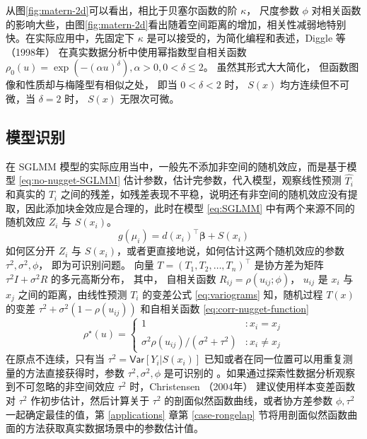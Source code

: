 \documentclass[12pt,a4paper,UTF8,twoside]{book}
\theoremstyle{definition}
\theoremstyle{definition}
\theoremstyle{definition}
\theoremstyle{remark}
\begin{document}
从图\ref{fig:matern-2d}可以看出，相比于贝塞尔函数的阶 \(\kappa\)，
尺度参数 \(\phi\)
对相关函数的影响大些，由图\ref{fig:matern-2d}看出随着空间距离的增加，相关性减弱地特别快。在实际应用中，先固定下
\(\kappa\) 是可以接受的，为简化编程和表述，Diggle 等 （1998年）
\citep{Diggle1998} 在真实数据分析中使用幂指数型自相关函数
\(\rho_{0}(u) = \exp(-(\alpha u)^{\delta}), \alpha > 0, 0 < \delta \leq 2\)。
虽然其形式大大简化， 但函数图像和性质却与梅隆型有相似之处， 即当
\(0 < \delta < 2\) 时， \(S(x)\) 均方连续但不可微，当 \(\delta = 2\)
时， \(S(x)\) 无限次可微。

\hypertarget{subsec:identify}{%
\subsection{模型识别}\label{subsec:identify}}

在 SGLMM 模型的实际应用当中，一般先不添加非空间的随机效应，而是基于模型
\eqref{eq:no-nugget-SGLMM} 估计参数，估计完参数，代入模型，观察线性预测
\(\hat{T_{i}}\) 和真实的 \(T_i\)
之间的残差，如残差表现不平稳，说明还有非空间的随机效应没有提取，因此添加块金效应是合理的，此时在模型
\eqref{eq:SGLMM} 中有两个来源不同的随机效应 \(Z_{i}\) 与 \(S(x_i)\)。
\begin{equation}
g(\mu_i) = d(x_i)^{\top}\boldsymbol{\beta} + S(x_i) \label{eq:no-nugget-SGLMM}
\end{equation} 如何区分开 \(Z_{i}\) 与
\(S(x_i)\)，或者更直接地说，如何估计这两个随机效应的参数
\(\tau^2, \sigma^2, \phi\)， 即为可识别问题。 向量
\(T = (T_1,T_2,\ldots,T_n)^{\top}\) 是协方差为矩阵
\(\tau^2I + \sigma^2R\) 的多元高斯分布， 其中， 自相关函数
\(R_{ij} = \rho(u_{ij}; \phi)\)， \(u_{ij}\) 是 \(x_i\) 与 \(x_j\)
之间的距离，由线性预测 \(T_{i}\) 的变差公式 \eqref{eq:variograms}
知，随机过程 \(T(x)\) 的变差 \(\tau^2 + \sigma^2(1-\rho(u_{ij}))\)
和自相关函数 \eqref{eq:corr-nugget-function} \begin{equation}
\rho^{\star}(u) =
\begin{cases}
                                     1 & : x_{i} = x_{j}  \\
\sigma^2\rho(u_{ij})/(\sigma^2+\tau^2) & : x_{i} \neq x_{j}
\end{cases} \label{eq:corr-nugget-function}
\end{equation} \noindent 在原点不连续，只有当
\(\tau^2 = \mathsf{Var}[Y_i|S(x_i)]\)
已知或者在同一位置可以用重复测量的方法直接获得时，参数
\(\tau^2, \sigma^2, \phi\) 是可识别的
\citep{Diggle2002Childhood, Diggle2007}。如果通过探索性数据分析观察到不可忽略的非空间效应
\(\tau^2\) 时，Christensen （2004年） \citep{Christensen2004}
建议使用样本变差函数对 \(\tau^2\) 作初步估计，然后计算关于 \(\tau^2\)
的剖面似然函数曲线，或者协方差参数 \(\phi,\tau^2\)一起确定最佳的值，第
\ref{applications} 章第 \ref{case-rongelap}
节将用剖面似然函数曲面的方法获取真实数据场景中的参数估计值。
\end{document}

